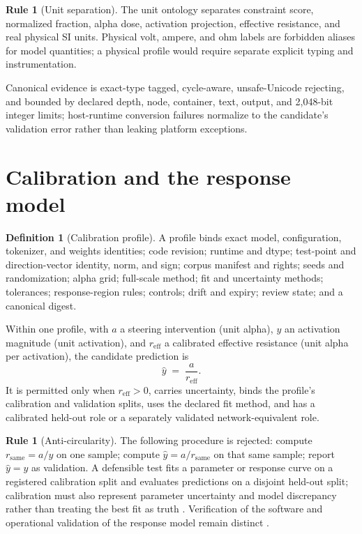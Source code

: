 \documentclass[11pt]{amsart}
\theoremstyle{definition}
\newtheorem{definition}[theorem]{Definition}
\newtheorem{ruleenv}[theorem]{Rule}
\theoremstyle{remark}
\begin{document}
\begin{ruleenv}[Unit separation]
The unit ontology separates constraint score, normalized fraction, alpha dose, activation projection, effective resistance, and real physical SI units. Physical volt, ampere, and ohm labels are forbidden aliases for model quantities; a physical profile would require separate explicit typing and instrumentation.
\end{ruleenv}

Canonical evidence is exact-type tagged, cycle-aware, unsafe-Unicode rejecting, and bounded by declared depth, node, container, text, output, and 2{,}048-bit integer limits; host-runtime conversion failures normalize to the candidate's validation error rather than leaking platform exceptions.

\section{Calibration and the response model}

\begin{definition}[Calibration profile]
A profile binds exact model, configuration, tokenizer, and weights identities; code revision; runtime and dtype; test-point and direction-vector identity, norm, and sign; corpus manifest and rights; seeds and randomization; alpha grid; full-scale method; fit and uncertainty methods; tolerances; response-region rules; controls; drift and expiry; review state; and a canonical digest.
\end{definition}

Within one profile, with $a$ a steering intervention (unit alpha), $y$ an activation magnitude (unit activation), and $r_{\mathrm{eff}}$ a calibrated effective resistance (unit alpha per activation), the candidate prediction is
\[
\hat{y} \;=\; \frac{a}{r_{\mathrm{eff}}}.
\]
It is permitted only when $r_{\mathrm{eff}}>0$, carries uncertainty, binds the profile's calibration and validation splits, uses the declared fit method, and has a calibrated held-out role or a separately validated network-equivalent role.

\begin{ruleenv}[Anti-circularity]\label{rule:circular}
The following procedure is rejected: compute $r_{\mathrm{same}} = a/y$ on one sample; compute $\hat{y} = a/r_{\mathrm{same}}$ on that same sample; report $\hat{y}=y$ as validation. A defensible test fits a parameter or response curve on a registered calibration split and evaluates predictions on a disjoint held-out split; calibration must also represent parameter uncertainty and model discrepancy rather than treating the best fit as truth \cite{kennedyohagan}. Verification of the software and operational validation of the response model remain distinct \cite{sargent}.
\end{ruleenv}
\end{document}
